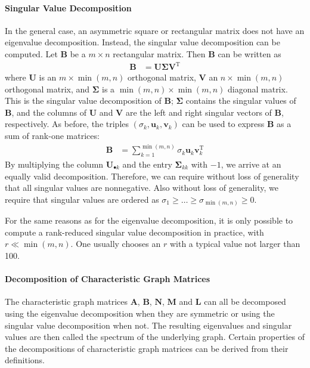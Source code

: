\documentclass[11pt,a4paper]{book}
\newcommand{\syRank}{r}
\begin{document}
\paragraph{Singular Value Decomposition}
\label{para:singular-value-decomposition} 
In the general case, an asymmetric square or rectangular matrix does not
have an eigenvalue decomposition.  
Instead, the singular value decomposition can be computed. 
Let $\mathbf B$ be a $m\times n$ rectangular matrix.  Then $\mathbf B$
can be written as
\begin{align}
  \mathbf B &= \mathbf U \mathbf \Sigma \mathbf V^{\mathrm T}
  \label{eq:singular-value-decomposition}
\end{align}
where $\mathbf U$ is an $m \times \min(m,n)$ orthogonal matrix, $\mathbf V$ an
$n \times \min(m,n)$ orthogonal matrix, and $\mathbf \Sigma$ is a $\min(m,n) \times \min(m,n)$
diagonal matrix.  
This is the singular value decomposition of $\mathbf B$;
$\mathbf \Sigma$ contains the singular values of $\mathbf B$, and the
columns of 
$\mathbf U$ and $\mathbf V$ are the left and right singular vectors of
$\mathbf B$,
respectively. 
As before, the triples $(\sigma_k, \mathbf u_k, \mathbf v_k)$ can be
used to express 
$\mathbf B$ as a sum of rank-one matrices:
\begin{align}
  \mathbf B &= \sum_{k=1}^{\min(m,n)} \sigma_k^{\phantom{\mathrm I}}
  \mathbf u_k^{\phantom{\mathrm I}} \mathbf v_k^{\mathrm T} 
\end{align}
By multiplying the column $\mathbf U_{\bullet k}$ and the entry
$\mathbf \Sigma_{kk}$ with $-1$, we arrive at an equally valid decomposition.
Therefore, we can require without loss of generality that all singular
values are nonnegative. Also without loss of generality, we require that
singular values are ordered as  $\sigma_1 \geq \ldots \geq
\sigma_{\min(m,n)} \geq 0$.

For the same reasons as for the eigenvalue decomposition, 
it is only possible to compute a rank-reduced singular value decomposition
in practice, with $\syRank \ll \min(m,n)$.  
One usually chooses an $\syRank$ with a typical value not larger than 100.

\paragraph{Decomposition of Characteristic Graph Matrices}
\label{sec:characteristic-decomposition}
The characteristic graph matrices $\mathbf A$, $\mathbf B$, $\mathbf
N$, $\mathbf M$ and $\mathbf L$ can all be decomposed using the
eigenvalue decomposition when they are symmetric or using the singular value decomposition when
not.  The resulting eigenvalues 
and singular values are then called the spectrum of the underlying graph.
Certain properties of the decompositions of characteristic graph matrices
can be derived from their definitions.  
\end{document}
